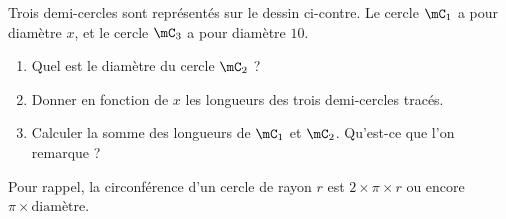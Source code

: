 
\begin{exercice}\label{exo2smath-0156}

%   

    \begin{multicols}{2}
    Trois demi-cercles sont représentés sur le dessin ci-contre. Le cercle \( \mC_1\) a pour diamètre \( x\), et le cercle \( \mC_3\) a pour diamètre \( 10\).

    \begin{enumerate}
        \item
            Quel est le diamètre du cercle \( \mC_2\) ?
        \item
            Donner en fonction de \( x\) les longueurs des trois demi-cercles tracés.
        \item   \label{ItemCUFLooIdJOVd}
            Calculer la somme des longueurs de \( \mC_1\) et \( \mC_2\). Qu'est-ce que l'on remarque ?
    \end{enumerate}
    Pour rappel, la circonférence d'un cercle de rayon \( r\) est \( 2\times \pi\times r\) ou encore \( \pi\times \text{diamètre}\).

    \columnbreak

    \begin{center}
   
    \end{center}
    \end{multicols}

\end{exercice}
